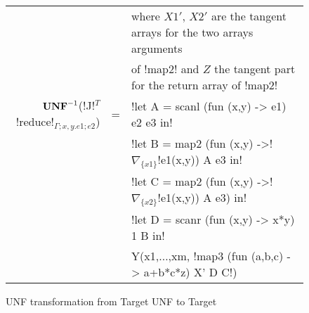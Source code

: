 \begin{figure*}[t]
\begin{tabular}{r c l}
    && where $X1'$, $X2'$ are the tangent arrays for the two arrays arguments \\
    && of !map2! and $Z$ the tangent part for the return array of !map2! \\
    $\mathbf{UNF}^{-1}$(!J!$^T$!reduce!$_{\Gamma;x,y.e1;e2}$) &=& !let A = scanl (fun (x,y) -> e1) e2 e3 in! \\
    && !let B = map2 (fun (x,y) ->! $\nabla_{\{x1\}}$!e1(x,y)) A e3 in!\\
    && !let C = map2 (fun (x,y) ->! $\nabla_{\{x2\}}$!e1(x,y)) A e3) in!\\
    && !let D = scanr (fun (x,y) -> x*y) 1 B in!\\
    && Y(x1,$\ldots$,xm, !map3 (fun (a,b,c) -> a+b*c*z) X' D C!)
    \end{tabular}
    \caption{UNF transformation from Target UNF to Target}
    \label{fig:unf_to_target}
    \end{figure*}